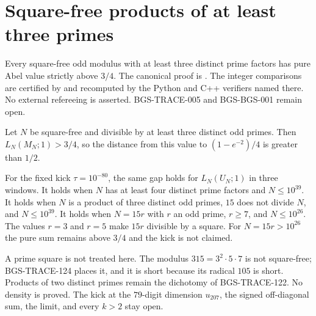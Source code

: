\section{Square-free products of at least three primes}
\label{sec:squarefree-product-abel}
Every square-free odd modulus with at least three distinct prime factors
has pure Abel value strictly above \(3/4\). The canonical proof is
.
The integer comparisons are certified by
 and recomputed by the
Python and C++ verifiers named there. No external refereeing is asserted.
BGS-TRACE-005 and BGS-BGS-001 remain open.

\begin{theorem}
\label{thm:squarefree-product-abel}
Let \(N\) be square-free and divisible by at least three distinct odd
primes. Then \(L_N(M_N;1)>3/4\), so the distance from this value to
\((1-e^{-2})/4\) is greater than \(1/2\).

For the fixed kick \(\tau=10^{-80}\), the same gap holds for
\(L_N(U_N;1)\) in three windows. It holds when \(N\) has at least four
distinct prime factors and \(N\le10^{39}\). It holds when \(N\) is a
product of three distinct odd primes, \(15\) does not divide \(N\), and
\(N\le10^{39}\). It holds when \(N=15r\) with \(r\) an odd prime,
\(r\ge7\), and \(N\le10^{26}\). The values \(r=3\) and \(r=5\) make \(15r\)
divisible by a square. For \(N=15r>10^{26}\) the pure sum remains
above \(3/4\) and the kick is not claimed.

A prime square is not treated here. The modulus \(315=3^2\cdot5\cdot7\) is
not square-free; BGS-TRACE-124 places it, and it is short because its
radical \(105\) is short. Products of two
distinct primes remain the dichotomy of BGS-TRACE-122. No density is
proved. The kick at the \(79\)-digit dimension \(u_{207}\), the signed
off-diagonal sum, the limit, and every \(k>2\) stay open.
\end{theorem}
